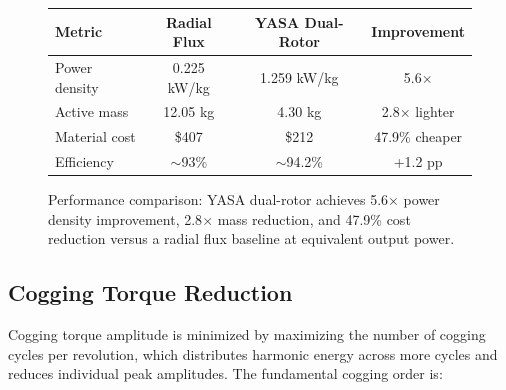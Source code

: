 \documentclass[12pt,a4paper]{article}
\begin{document}
\begin{figure}[!htbp]
\centering
{}

\vspace{3mm}

\begin{center}
\footnotesize
\begin{tabular}{lccc}
\textbf{Metric} & \textbf{Radial Flux} & \textbf{YASA Dual-Rotor} & \textbf{Improvement} \\
\hline
Power density & 0.225 kW/kg & 1.259 kW/kg & 5.6$\times$ \\
Active mass & 12.05 kg & 4.30 kg & 2.8$\times$ lighter \\
Material cost & \$407 & \$212 & 47.9\% cheaper \\
Efficiency & $\sim$93\% & $\sim$94.2\% & +1.2 pp \\
\end{tabular}
\end{center}

\caption{Performance comparison: YASA dual-rotor achieves 5.6$\times$ power density improvement, 2.8$\times$ mass reduction, and 47.9\% cost reduction versus a radial flux baseline at equivalent output power.}
\label{fig:performance}
\end{figure}

\subsection{Cogging Torque Reduction}
Cogging torque amplitude is minimized by maximizing the number of cogging cycles per revolution, which distributes harmonic energy across more cycles and reduces individual peak amplitudes. The fundamental cogging order is:
\end{document}
